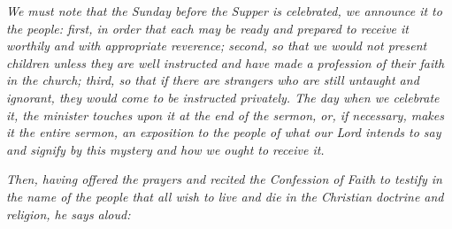 \documentclass[
]{book}
\begin{document}
\protect\hypertarget{chapter-slug-1-calvins-service-of-the-lords-supper-1542-1566}{\href{}{}}

\protect\hypertarget{appendix2.1}{\href{}{}}

\emph{We must note that the Sunday before the Supper is celebrated, we announce it to the people: first, in order that each may be ready and prepared to receive it worthily and with appropriate reverence; second, so that we would not present children unless they are well instructed and have made a profession of their faith in the church; third, so that if there are strangers who are still untaught and ignorant, they would come to be instructed privately. The day when we celebrate it, the minister touches upon it at the end of the sermon, or, if necessary, makes it the entire sermon, an exposition to the people of what our Lord intends to say and signify by this mystery and how we ought to receive it.}

\emph{Then, having offered the prayers and recited the Confession of Faith to testify in the name of the people that all wish to live and die in the Christian doctrine and religion, he says aloud:}
\end{document}
